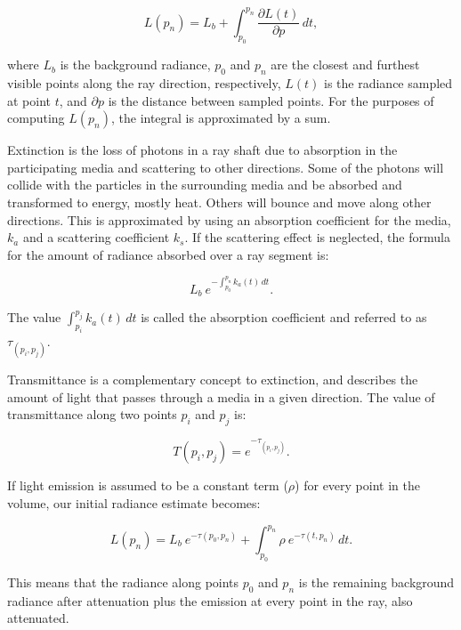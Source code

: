 \documentclass[oneside,a4paper,english,links]{amca}
\begin{document}
\begin{equation} \label{eq:general_radiance}  
  L(p_n) = L_b + \int_{p_0}^{p_n} \frac{\partial L(t)}{\partial p} \, dt,
\end{equation}

\noindent where $L_b$ is the background radiance, $p_0$ and $p_n$ are the
closest and furthest visible points along the ray direction,
respectively, $L(t)$ is the radiance sampled at point $t$, and
$\partial p$ is the distance between sampled points. For the purposes
of computing $L(p_n)$, the integral is approximated by a sum.

Extinction is the loss of photons in a ray shaft due to absorption in
the participating media and scattering to other directions. Some of
the photons will collide with the particles in the
surrounding media and be absorbed and transformed to energy, mostly
heat. Others will bounce and move along other directions. This is
approximated by using an absorption coefficient for the media, $k_a$
and a scattering coefficient $k_s$. If the scattering effect is
neglected, the formula for the amount of radiance absorbed over a
ray segment is:

\begin{equation} \label{eq:radiance_absorption}  
    L_b \ \displaystyle e^{-\int_{p_0}^{p_n} k_a(t) \, dt}.
\end{equation}

The value $\int_{p_i}^{p_j} k_a(t) \, dt$ is called the
absorption coefficient and referred to as $\tau_{(p_i, p_j)}$.

Transmittance is a complementary concept to extinction, and describes
the amount of light that passes through a media in a given
direction. The value of transmittance along two points $p_i$ and $p_j$
is:

\begin{equation} \label{eq:general_radiance}  
  T(p_i,p_j) = e^{-\tau_{(p_i, p_j)}}.
\end{equation}

If light emission is assumed to be a constant term ($\rho$) for
every point in the volume, our initial radiance estimate becomes:

\begin{equation} \label{eq:ray_radiance}  
  L(p_n) = L_b \ e^{-\tau(p_0, p_n)} + \int_{p_0}^{p_n} \rho \ e^{-\tau(t,p_n)} \, dt.
\end{equation}

This means that the radiance along points $p_0$ and
$p_n$ is the remaining background radiance after attenuation plus the
emission at every point in the ray, also attenuated.
\end{document}
